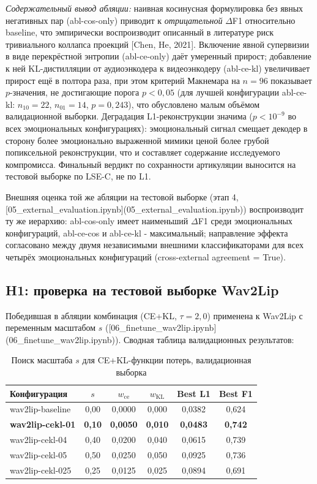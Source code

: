 \documentclass[a4paper, 12pt, oneside, openany]{article}
\begin{document}
\textit{Содержательный вывод абляции:} наивная косинусная формулировка без явных негативных пар (abl-cos-only) приводит к \textit{отрицательной} $\Delta$F1 относительно baseline, что эмпирически воспроизводит описанный в литературе риск тривиального коллапса проекций [Chen, He, 2021]. Включение явной супервизии в виде перекрёстной энтропии (abl-ce-only) даёт умеренный прирост; добавление к ней KL-дистилляции от аудиоэнкодера к видеоэнкодеру (abl-ce-kl) увеличивает прирост ещё в полтора раза, при этом критерий Макнемара на $n=96$ показывает $p$-значения, не достигающие порога $p<0{,}05$ (для лучшей конфигурации abl-ce-kl: $n_{10}=22$, $n_{01}=14$, $p = 0{,}243$), что обусловлено малым объёмом валидационной выборки. Деградация L1-реконструкции значима ($p < 10^{-9}$ во всех эмоциональных конфигурациях): эмоциональный сигнал смещает декодер в сторону более эмоционально выраженной мимики ценой более грубой попиксельной реконструкции, что и составляет содержание исследуемого компромисса. Финальный вердикт по сохранности артикуляции выносится на тестовой выборке по LSE-C, не по L1.

Внешняя оценка той же абляции на тестовой выборке (этап 4, [05\_external\_evaluation.ipynb](05\_external\_evaluation.ipynb)) воспроизводит ту же иерархию: abl-cos-only имеет наименьший $\Delta$F1 среди эмоциональных конфигураций, abl-ce-cos и abl-ce-kl - максимальный; направление эффекта согласовано между двумя независимыми внешними классификаторами для всех четырёх эмоциональных конфигураций (cross-external agreement = True).

\subsection{H1: проверка на тестовой выборке Wav2Lip}

Победившая в абляции комбинация (CE+KL, $\tau=2{,}0$) применена к Wav2Lip с переменным масштабом $s$ ([06\_finetune\_wav2lip.ipynb](06\_finetune\_wav2lip.ipynb)). Сводная таблица валидационных результатов:

\begin{table}[H]
\caption{Поиск масштаба $s$ для CE+KL-функции потерь, валидационная выборка}
\label{tab:scale_sweep}
\centering
\small
\begin{tabular}{|p{2.7cm}|c|c|c|c|c|}
\hline
\textbf{Конфигурация} & $s$ & $w_{\text{ce}}$ & $w_{\text{KL}}$ & \textbf{Best L1} & \textbf{Best F1} \\
\hline
wav2lip-baseline & 0,00 & 0,0000 & 0,000 & 0,0382 & 0,624 \\
\hline
\textbf{wav2lip-cekl-01} & \textbf{0,10} & \textbf{0,0050} & \textbf{0,010} & \textbf{0,0483} & \textbf{0,742} \\
\hline
wav2lip-cekl-04 & 0,40 & 0,0200 & 0,040 & 0,0615 & 0,739 \\
\hline
wav2lip-cekl-05 & 0,50 & 0,0250 & 0,050 & 0,0925 & 0,736 \\
\hline
wav2lip-cekl-025 & 0,25 & 0,0125 & 0,025 & 0,0894 & 0,691 \\
\hline
\end{tabular}
\end{table}
\end{document}
